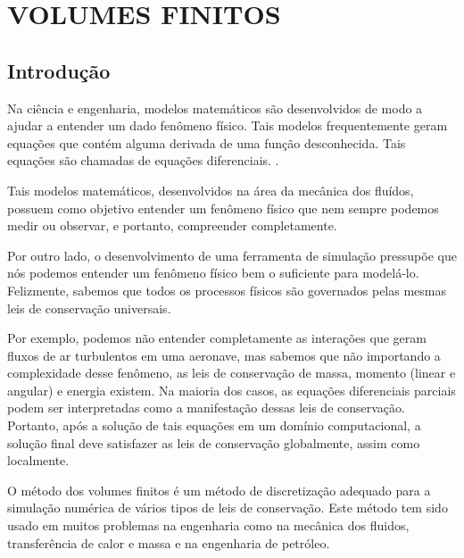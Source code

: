 

\chapter[VOLUMES FINITOS]{VOLUMES FINITOS}

\section{Introdução}

Na ciência e engenharia, modelos matemáticos são desenvolvidos de modo a ajudar a entender um dado fenômeno físico. Tais modelos frequentemente geram equações que contém alguma derivada de uma função desconhecida. Tais equações são chamadas de equações diferenciais. \cite{NagleR.KentB.SaffEdwardDavidSnider2012}.

Tais modelos matemáticos, desenvolvidos na área da mecânica dos fluídos, possuem como objetivo entender um fenômeno físico que nem sempre podemos medir ou observar, e portanto, compreender completamente. \cite{book}

Por outro lado, o desenvolvimento de uma ferramenta de simulação pressupõe que nós podemos entender um fenômeno físico bem o suficiente para modelá-lo. Felizmente, sabemos que todos os processos físicos são governados pelas mesmas leis de conservação universais.

Por exemplo, podemos não entender completamente as interações que geram fluxos de ar turbulentos em uma aeronave, mas sabemos que não importando a complexidade desse fenômeno, as leis de conservação de massa, momento (linear e angular) e energia existem.
Na maioria dos casos, as equações diferenciais parciais podem ser interpretadas como a manifestação dessas leis de conservação. Portanto, após a solução de tais equações em um domínio computacional, a solução final deve satisfazer as leis de conservação globalmente, assim como localmente.

O método dos volumes finitos é um método de discretização adequado para a simulação numérica de vários tipos de leis de conservação. Este método tem sido usado em muitos problemas na engenharia como na mecânica dos fluidos, transferência de calor e massa e na engenharia de petróleo.

